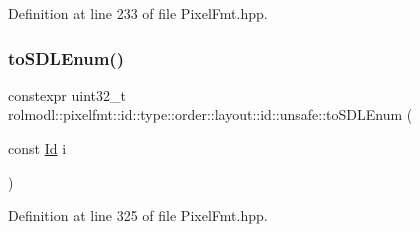 Definition at line 233 of file Pixel\+Fmt.\+hpp.

\mbox{\label{namespacerolmodl_1_1pixelfmt_1_1id_1_1type_1_1order_1_1layout_1_1id_1_1unsafe_a4aa69ca9aba67ea7cda4f41f2c1ff73d}} 
\subsubsection{\texorpdfstring{toSDLEnum()}{toSDLEnum()}}
{\footnotesize\ttfamily constexpr uint32\+\_\+t rolmodl\+::pixelfmt\+::id\+::type\+::order\+::layout\+::id\+::unsafe\+::to\+S\+D\+L\+Enum (\begin{DoxyParamCaption}\item[{const \mbox{\hyperlink{namespacerolmodl_1_1pixelfmt_a96282713e4465ba9211c8fd3a702b52b}{Id}}}]{i }\end{DoxyParamCaption})\hspace{0.3cm}{\ttfamily [noexcept]}}



Definition at line 325 of file Pixel\+Fmt.\+hpp.

